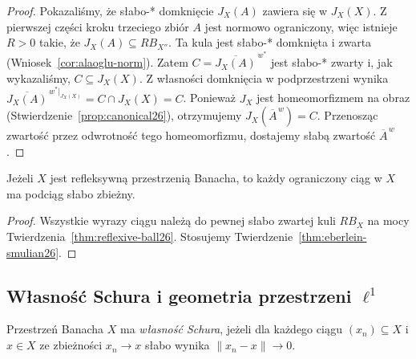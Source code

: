 \begin{proof}
Pokazaliśmy, że słabo-* domknięcie $J_X(A)$ zawiera się
w $J_X(X)$. Z pierwszej części kroku trzeciego zbiór $A$
jest normowo ograniczony, więc istnieje $R>0$ takie,
że $J_X(A)\subseteq RB_{X''}$. Ta kula jest słabo-*
domknięta i zwarta (Wniosek~\ref{cor:alaoglu-norm}).
Zatem $C=\overline{J_X(A)}^{\,w^\ast}$ jest słabo-*
zwarty i, jak wykazaliśmy, $C\subseteq J_X(X)$.
Z własności domknięcia w podprzestrzeni wynika
$\overline{J_X(A)}^{\,w^\ast|_{J_X(X)}}=C\cap J_X(X)=C$.
Ponieważ $J_X$ jest homeomorfizmem na obraz
(Stwierdzenie~\ref{prop:canonical26}), otrzymujemy
$J_X(\overline A^{\,w})=C$.
Przenosząc zwartość przez odwrotność tego
homeomorfizmu, dostajemy słabą zwartość
$\overline A^{\,w}$.
\end{proof}

\begin{wniosek}
\label{cor:bounded-subsequence26}
Jeżeli $X$ jest refleksywną przestrzenią Banacha,
to każdy ograniczony ciąg w $X$ ma podciąg słabo zbieżny.
\end{wniosek}
\begin{proof}
Wszystkie wyrazy ciągu należą do pewnej słabo zwartej kuli
$RB_X$ na mocy Twierdzenia~\ref{thm:reflexive-ball26}.
Stosujemy Twierdzenie~\ref{thm:eberlein-smulian26}.
\end{proof}

\subsection{Własność Schura i geometria przestrzeni \texorpdfstring{$\ell^1$}{ell1}}

\begin{definicja}
\label{def:schur26}
Przestrzeń Banacha $X$ ma \emph{własność Schura}, jeżeli dla
każdego ciągu $(x_n)\subseteq X$ i $x\in X$ ze zbieżności
$x_n\to x$ słabo wynika $\|x_n-x\|\to0$.
\end{definicja}

